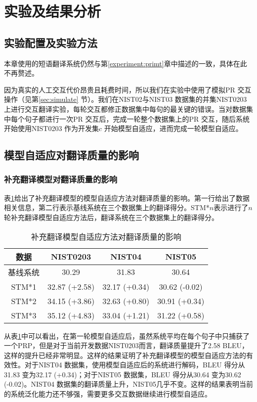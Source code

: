 \documentclass[master, winfont]{njuthesis}
\begin{document}
\section{实验及结果分析}
\label{experiment:adaptation}
\subsection{实验配置及实验方法}
本章使用的短语翻译系统仍然与第\ref{experiment:primt}章中描述的一致，具体在此不再赘述。

因为真实的人工交互代价昂贵且耗费时间，所以我们在实验中使用了模拟PR 交互操作（见第\ref{sec:simulate} 节）。我们在NIST02与NIST03 数据集的并集NIST0203 上进行交互翻译实验，每轮交互都修正数据集中每句的最关键的错误。当对数据集中每个句子都进行一次PR 交互后，完成一轮整个数据集上的PR 交互，随后系统开始使用NIST0203 作为开发集$c$ 开始模型自适应，进而完成一轮模型自适应。

\subsection{模型自适应对翻译质量的影响}
\subsubsection{补充翻译模型对翻译质量的影响}
表\ref{table:adaptation1}给出了补充翻译模型的模型自适应方法对翻译质量的影响。第一行给出了数据相关信息，第二行表示基线系统在三个数据集上的翻译得分。STM*$n$表示进行了$n$轮补充翻译模型自适应方法后，翻译系统在三个数据集上的翻译得分。

\begin{table}[!htb]
\begin{center}
\begin{tabular}{c|c|c|c}
\hline
数据& NIST0203 & NIST04 & NIST05\\
\hline
基线系统 & 30.29 & 31.83 & 30.64 \\
\hline
STM*1 & 32.87 (+2.58) & 32.17 (+0.34) & 30.62 (-0.02)\\
\hline
STM*2 & 34.15 (+3.86) & 32.63 (+0.80) & 30.91 (+0.34)\\
\hline
STM*3 & 35.12 (+4.83) & 33.04 (+1.21) & 31.22 (+0.58)\\
\hline
\end{tabular}
\end{center}
\caption{\label{table:adaptation1} 补充翻译模型自适应方法对翻译质量的影响}
\end{table}

从表\ref{table:adaptation1}中可以看出，在第一轮模型自适应后，虽然系统平均在每个句子中只捕获了一个PRP，但是对于当前开发数据NIST0203而言，翻译质量提升了2.58 BLEU，这样的提升已经非常明显。这样的结果证明了补充翻译模型的模型自适应方法的有效性。对于NIST04 数据集，使用模型自适应后的系统进行解码，BLEU 得分从31.83 变为32.17 (+0.34)；对于NIST05 数据集，BLEU 得分从30.64 变为30.62 (-0.02)。NIST04 数据集的翻译质量上升，NIST05几乎不变。这样的结果表明当前的系统泛化能力还不够强，需要更多交互数据继续进行模型自适应。
\end{document}
